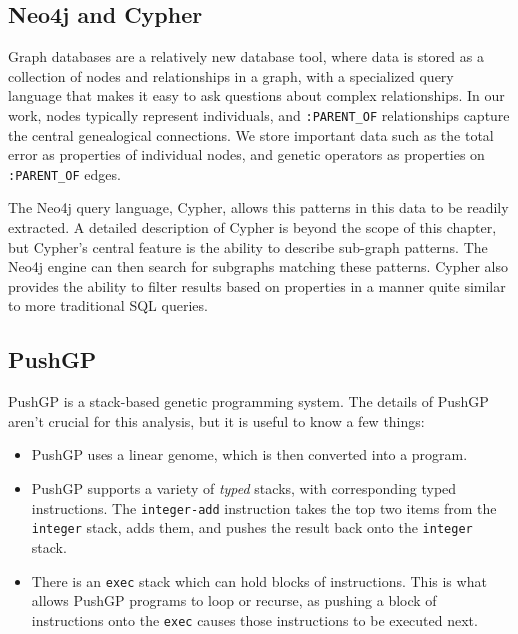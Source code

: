 \subsection{Neo4j and Cypher}
\label{subsec:Neo4j}


Graph databases \citep{Robinson:GraphDB:Book} are a relatively new database tool, where data is stored 
as a collection of nodes and relationships in a graph, with a specialized query language that makes 
it easy to ask questions about complex relationships.
In our work, nodes typically represent individuals, and \texttt{:PARENT\_OF} relationships 
capture the central genealogical connections. We store important data such as the total error as
properties of individual nodes, and genetic operators as properties on 
\texttt{:PARENT\_OF} edges.

The Neo4j query language, Cypher, allows this patterns in this data to be readily extracted.
A detailed description of Cypher is beyond the scope of this chapter, but Cypher's central feature is
the ability to describe sub-graph patterns. The Neo4j engine can then search
for subgraphs matching these patterns. Cypher also provides the ability to 
filter results based on properties in a manner quite similar to more traditional SQL queries.

\subsection{PushGP}

PushGP \citep{spector:2002:GPEM, 1068292:new} is a stack-based genetic programming system. The details
of PushGP aren't crucial for this analysis, but it is useful to know a few things:
\begin{itemize}
	\item PushGP uses a linear genome, which is then converted into a program.
	\item PushGP supports a variety of \emph{typed} stacks, with corresponding typed instructions.
	The \texttt{integer-add} instruction takes the top two items from the \texttt{integer}
	stack, adds them, and pushes the result back onto the \texttt{integer} stack.
	\item There is an \texttt{exec} stack which can hold blocks of instructions. This is what allows
	PushGP programs to loop or recurse, as pushing a block of instructions onto the \texttt{exec}
	causes those instructions to be executed next.
\end{itemize}

